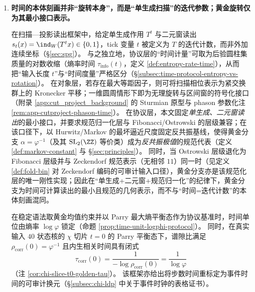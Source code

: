 \begin{enumerate}
  \item \textbf{时间的本体刻画并非“旋转本身”，而是“单生成扫描”的迭代参数；黄金旋转仅为其最小接口表示。}

  \begin{theorem}[扫描迭代时间与黄金分支的规范性]
  \label{thm:terminal-time-protocol-golden-branch}
  在扫描—投影读出框架中，给定单生成作用 \(T^t\) 与二元窗读出
  \(s_t(x)=\ind_W(T^t x)\in\{0,1\}\)，tick 变量 \(t\) 被定义为 \(T\) 的迭代计数，而非外加连续坐标（\S\ref{sec:spg}）。
  与之独立地，协议层的“时间计量”可取为后验圆柱集质量的对数收缩（熵率时间 \(\tau_{\mathrm{info}}(t)\)，定义 \ref{def:entropy-rate-time}），从而把“输入长度 \(t\)”与“时间度量”严格区分（\S\ref{subsec:time-protocol-entropy-vs-rotation}）。
  在对象层，若存在最大等距因子，则可将扫描相位表示为紧交换群上的 Kronecker 平移；一维圆周情形下即为无理旋转与区间窗的符号化接口（附录 \ref{app:cut_project_background} 的 Sturmian 原型与 phason 参数化注 \ref{rem:app-cutproject-phason-time}）。
  在协议层，本文固定\emph{单生成、二元窗读出}的最小接口，并要求规范归一化层与 Fibonacci/Ostrowski 的层级兼容；在该口径下，以 Hurwitz/Markov 的最坏逼近尺度固定反共振基线，使得黄金分支 \(\alpha=\varphi^{-1}\)（及其 \(\mathrm{SL}_2(\ZZ)\) 等价类）成为\emph{反共振极值}的规范代表（定义 \ref{def:markov-constant} 与 \S\ref{sec:principles}）。
  同时，当 Ostrowski 层级退化为 Fibonacci 层级并与 Zeckendorf 规范表示（无相邻 \(11\)）同一时（见定义 \ref{def:fold-bin} 对 Zeckendorf 编码的可审计输入口径），黄金分支亦是该规范化层的唯一刚性实现；因此在“单生成+二元窗+规范归一化”的纪律下，黄金分支为时间可计算读出的最小且规范的几何表示，而不与“时间=迭代计数”的本体刻画混同。
  \end{theorem}

  \begin{corollary}
  \label{cor:terminal-tau-corr-logphi}
  在稳定语法取黄金均值约束并以 Parry 最大熵平衡态作为协议基准时，时间单位由熵率 \(\log\varphi\) 锁定（命题 \ref{prop:time-unit-logphi-protocol}）。
  同时，在真实输入 \(40\) 状态核的 \(\chi\) 切片 \(t=0\) 的 Parry 平衡态下，谱隙比满足
  \(
  \rho_{\mathrm{corr}}(0)=\varphi^{-1}
  \)
  且内生相关时间具有闭式
  \[
  \tau_{\mathrm{corr}}(0)=\frac{1}{-\log\rho_{\mathrm{corr}}(0)}=\frac{1}{\log\varphi}
  \]
  （注 \ref{cor:chi-slice-t0-golden-tau}）。
  该框架亦给出将步数时间重标定为事件时间的可审计换元（\S\ref{subsec:chi-ldp} 中关于事件时钟的表格证书）。
  \end{corollary}


\end{enumerate}
